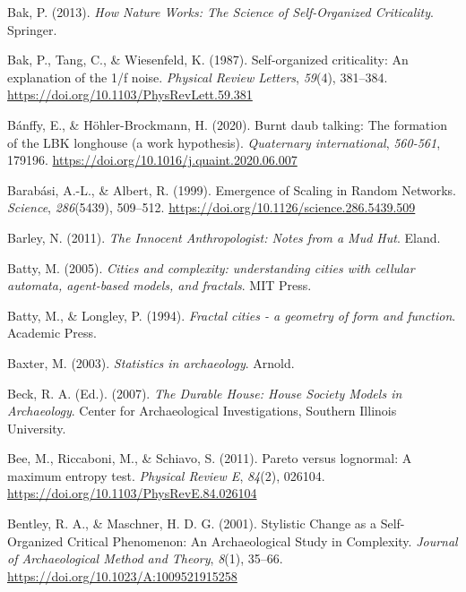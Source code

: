 \documentclass[
  12pt,
]{book}
\newlength{\cslhangindent}
\newlength{\cslentryspacingunit} %
\newenvironment{CSLReferences}[2] %
 {%
  \setlength{\parindent}{0pt}
  \ifodd #1
  \let\oldpar\par
  \def\par{\hangindent=\cslhangindent\oldpar}
  \fi
  \setlength{\parskip}{#2\cslentryspacingunit}
 }%
 {}
\begin{document}
\begin{CSLReferences}{1}{0}
\leavevmode{}%
Bak, P. (2013). \emph{How {Nature Works}: {The Science} of {Self-Organized Criticality}}. {Springer}.

\leavevmode{}%
Bak, P., Tang, C., \& Wiesenfeld, K. (1987). Self-organized criticality: {An} explanation of the 1/f noise. \emph{Physical Review Letters}, \emph{59}(4), 381--384. \url{https://doi.org/10.1103/PhysRevLett.59.381}

\leavevmode{}%
Bánffy, E., \& Höhler-Brockmann, H. (2020). Burnt daub talking: The formation of the LBK longhouse (a work hypothesis). \emph{Quaternary international}, \emph{560-561}, 179196. \url{https://doi.org/10.1016/j.quaint.2020.06.007}

\leavevmode{}%
Barabási, A.-L., \& Albert, R. (1999). Emergence of Scaling in Random Networks. \emph{Science}, \emph{286}(5439), 509--512. \url{https://doi.org/10.1126/science.286.5439.509}

\leavevmode{}%
Barley, N. (2011). \emph{The Innocent Anthropologist: Notes from a Mud Hut}. Eland.

\leavevmode{}%
Batty, M. (2005). \emph{Cities and complexity: understanding cities with cellular automata, agent-based models, and fractals}. MIT Press.

\leavevmode{}%
Batty, M., \& Longley, P. (1994). \emph{Fractal cities - a geometry of form and function}. Academic Press.

\leavevmode{}%
Baxter, M. (2003). \emph{Statistics in archaeology}. Arnold.

\leavevmode{}%
Beck, R. A. (Ed.). (2007). \emph{The Durable House: House Society Models in Archaeology}. Center for Archaeological Investigations, Southern Illinois University.

\leavevmode{}%
Bee, M., Riccaboni, M., \& Schiavo, S. (2011). Pareto versus lognormal: A maximum entropy test. \emph{Physical Review E}, \emph{84}(2), 026104. \url{https://doi.org/10.1103/PhysRevE.84.026104}

\leavevmode{}%
Bentley, R. A., \& Maschner, H. D. G. (2001). Stylistic {Change} as a {Self-Organized Critical Phenomenon}: {An Archaeological Study} in {Complexity}. \emph{Journal of Archaeological Method and Theory}, \emph{8}(1), 35--66. \url{https://doi.org/10.1023/A:1009521915258}


\end{CSLReferences}
\end{document}
